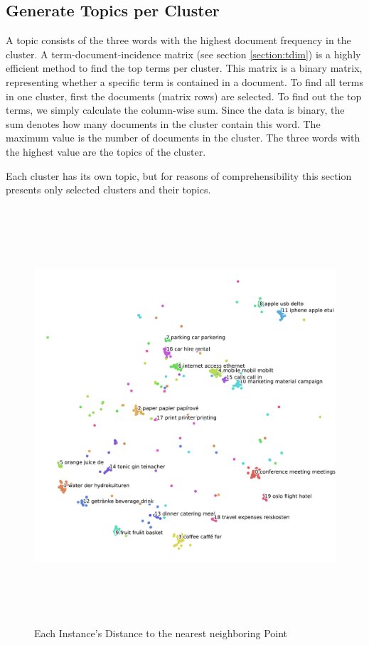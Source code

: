 \subsection{Generate Topics per Cluster}
\label{section:topics}
A topic consists of the three words with the highest document frequency in the cluster. A term-document-incidence matrix (see section \ref{section:tdim}) is a highly efficient method to find the top terms per cluster. This matrix is a binary matrix, representing whether a specific term is contained in a document. To find all terms in one cluster, first the documents (matrix rows) are selected. To find out the top terms, we simply calculate the column-wise sum. Since the data is binary, the sum denotes how many documents in the cluster contain this word. The maximum value is the number of documents in the cluster. The three words with the highest value are the topics of the cluster.

Each cluster has its own topic, but for reasons of comprehensibility this section presents only selected clusters and their topics.

\begin{figure}[!h]
	\centering
	\includegraphics[height=15.5cm]{Bilder/models/topics.pdf}
	\caption{Each Instance's Distance to the nearest neighboring Point}
	\label{fig:topics}
\end{figure}

